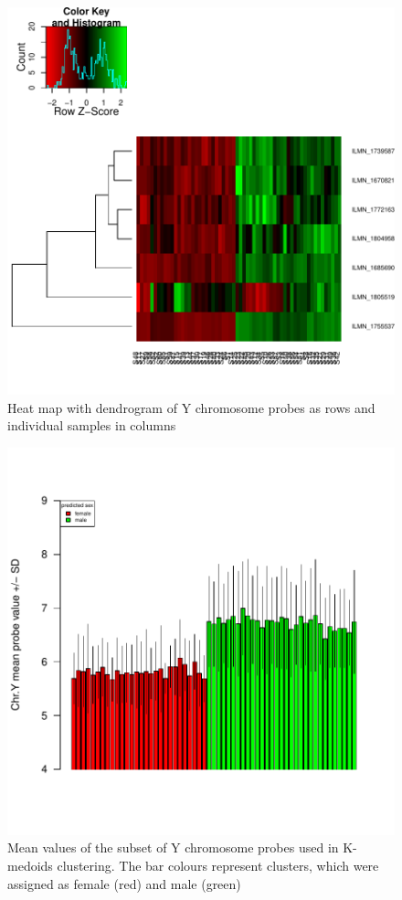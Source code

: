 \documentclass{article}
\begin{document}
\begin{figure}
\begin{center}
\includegraphics{massiR_vignette-fig2}
\end{center}
\caption{Heat map with dendrogram of Y chromosome probes as rows and individual samples in columns}
\label{fig:fig2}
\end{figure}

\begin{figure}
\begin{center}
\includegraphics{massiR_vignette-fig3}
\end{center}
\caption{Mean values of the subset of Y chromosome probes used in K-medoids clustering. The bar colours represent clusters, which were assigned as female (red) and male (green)}
\label{fig:fig3}
\end{figure}
\end{document}
